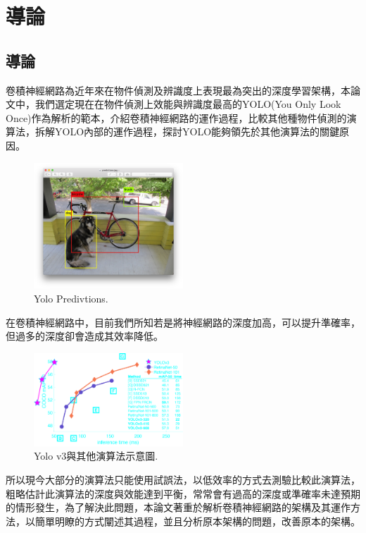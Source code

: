 \chapter{導論}
\label{c:1}

\section{導論}
卷積神經網路為近年來在物件偵測及辨識度上表現最為突出的深度學習架構，本論文中，我們選定現在在物件偵測上效能與辨識度最高的YOLO(You Only Look Once)作為解析的範本，介紹卷積神經網路的運作過程，比較其他種物件偵測的演算法，拆解YOLO內部的運作過程，探討YOLO能夠領先於其他演算法的關鍵原因。
\\
\begin{figure}[H]
  \centering
    \includegraphics[width=0.5\textwidth]{fig/yolopredictions.png}
    \caption{\label{fig:yolov3}Yolo Predivtions.}
\end{figure}
在卷積神經網路中，目前我們所知若是將神經網路的深度加高，可以提升準確率，但過多的深度卻會造成其效率降低。\\
\begin{figure}[H]
  \centering
    \includegraphics[width=0.5\textwidth]{fig/map50blue.png}
    \caption{\label{fig:yolov3}Yolo v3與其他演算法示意圖.}
\end{figure}
所以現今大部分的演算法只能使用試誤法，以低效率的方式去測驗比較此演算法，粗略估計此演算法的深度與效能達到平衡，常常會有過高的深度或準確率未達預期的情形發生，為了解決此問題，本論文著重於解析卷積神經網路的架構及其運作方法，以簡單明瞭的方式闡述其過程，並且分析原本架構的問題，改善原本的架構。\\

